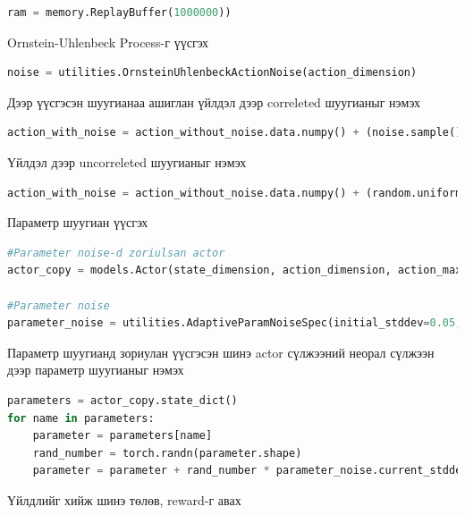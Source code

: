\documentclass[12pt,A4]{report}
\begin{document}
\begin{lstlisting}[language=Python, caption=Replay buffer үүсгэх, frame=single]
ram = memory.ReplayBuffer(1000000))
\end{lstlisting}

Ornstein-Uhlenbeck Process-г үүсгэх

\begin{lstlisting}[language=Python, caption=Шуугиан үүсгэх, frame=single]
noise = utilities.OrnsteinUhlenbeckActionNoise(action_dimension)
\end{lstlisting}

Дээр үүсгэсэн шуугианаа ашиглан үйлдэл дээр correleted шуугианыг нэмэх

\begin{lstlisting}[language=Python, caption=Үйлдэл дээр шуугиан нэмэх, frame=single]
action_with_noise = action_without_noise.data.numpy() + (noise.sample() * action_max)
\end{lstlisting}

Үйлдэл дээр uncorreleted шуугианыг нэмэх

\begin{lstlisting}[language=Python, caption=Үйлдэл дээр шуугиан нэмэх, frame=single]
action_with_noise = action_without_noise.data.numpy() + (random.uniform(-0.2, 0.2) * action_max)
\end{lstlisting}

Параметр шуугиан үүсгэх

\begin{lstlisting}[language=Python, caption=Үйлдэл дээр шуугиан нэмэх, frame=single]
#Parameter noise-d zoriulsan actor
actor_copy = models.Actor(state_dimension, action_dimension, action_max)

#Parameter noise
parameter_noise = utilities.AdaptiveParamNoiseSpec(initial_stddev=0.05,desired_action_stddev=0.3, adaptation_coefficient=1.05)
\end{lstlisting}

Параметр шуугианд зориулан үүсгэсэн шинэ actor сүлжээний неорал сүлжээн дээр параметр шуугианыг нэмэх

\begin{lstlisting}[language=Python, caption=Үйлдэл хийх, frame=single]
parameters = actor_copy.state_dict()
for name in parameters:
    parameter = parameters[name]
    rand_number = torch.randn(parameter.shape)
    parameter = parameter + rand_number * parameter_noise.current_stddev
\end{lstlisting}

Үйлдлийг хийж шинэ төлөв, reward-г авах
\end{document}
